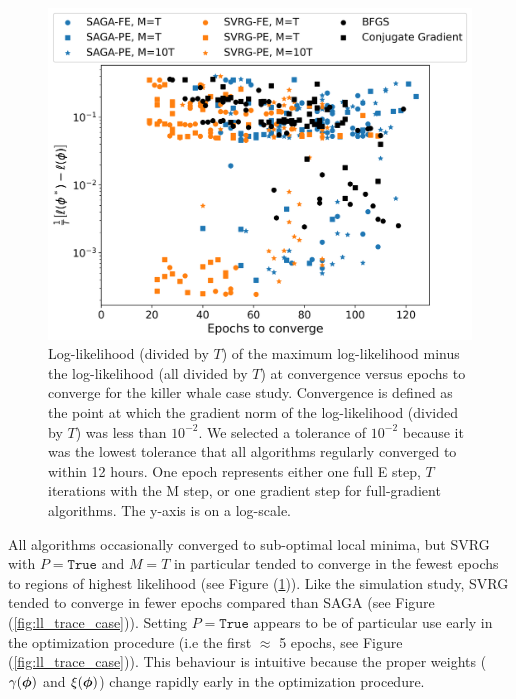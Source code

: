 \begin{figure}
    \centering
    \includegraphics[width=6.5in]{../plt/scatterplot_case_study.png}
    \caption{Log-likelihood (divided by $T$) of the maximum log-likelihood minus the log-likelihood (all divided by $T$) at convergence versus epochs to converge for the killer whale case study. Convergence is defined as the point at which the gradient norm of the log-likelihood (divided by $T$) was less than $10^{-2}$. We selected a tolerance of $10^{-2}$ because it was the lowest tolerance that all algorithms regularly converged to within 12 hours. One epoch represents either one full E step, $T$ iterations with the M step, or one gradient step for full-gradient algorithms. The y-axis is on a log-scale.}
    \label{fig:scatterplot_case}
\end{figure}
%
All algorithms occasionally converged to sub-optimal local minima, but SVRG with $P=\texttt{True}$ and $M=T$ in particular tended to converge in the fewest epochs to regions of highest likelihood (see Figure (\ref{fig:scatterplot_case})).  Like the simulation study, SVRG tended to converge in fewer epochs compared than SAGA (see Figure (\ref{fig:ll_trace_case})). Setting $P = \texttt{True}$ appears to be of particular use early in the optimization procedure (i.e the first $\approx$ 5 epochs, see Figure (\ref{fig:ll_trace_case})). This behaviour is intuitive because the proper weights ($\gamma(\boldsymbol{\phi})$ and $\xi(\boldsymbol{\phi})$) change rapidly early in the optimization procedure. 


